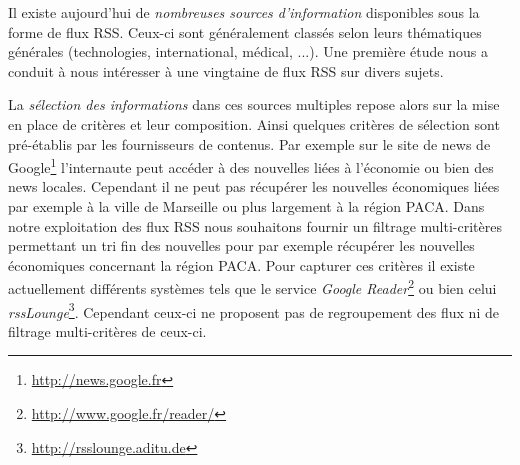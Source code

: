 \documentclass[]{easychair}
\newcommand{\comment}[4]{\par\noindent\hspace*{-0.5cm}{\parbox{\columnwidth}{\textbf{\color{#1}//#2[#3]:#4}}}\par}
\newcommand{\ch}[1]{\comment{green}{}{#1}{CH}}
\begin{document}

Il existe aujourd'hui de \textit{nombreuses sources d'information} disponibles sous la forme de flux RSS. Ceux-ci sont généralement classés selon leurs thématiques générales (technologies, international, médical, ...). Une première étude nous a conduit à nous intéresser à une vingtaine de flux RSS sur divers sujets. 



La \textit{sélection des informations} dans ces sources multiples repose alors sur la mise en place de critères et leur composition. 
Ainsi  quelques critères de sélection sont  pré-établis par les fournisseurs de contenus.  Par exemple sur le site de news de Google\footnote{\url{http://news.google.fr}} l'internaute peut accéder à des nouvelles liées à l'économie ou bien des news locales. Cependant il ne peut pas récupérer les nouvelles économiques liées par exemple à la ville de Marseille ou plus largement à la région PACA. Dans notre exploitation des flux RSS nous souhaitons fournir un filtrage multi-critères permettant un tri fin des nouvelles pour par exemple récupérer les nouvelles économiques concernant la région PACA. 
Pour capturer ces critères il existe actuellement différents systèmes tels que le service \textsl{Google Reader}\footnote{\url{http://www.google.fr/reader/}} ou bien celui \textsl{rssLounge}\footnote{\url{http://rsslounge.aditu.de}}. Cependant ceux-ci ne proposent pas de regroupement des flux ni de filtrage multi-critères de ceux-ci.
\end{document}

